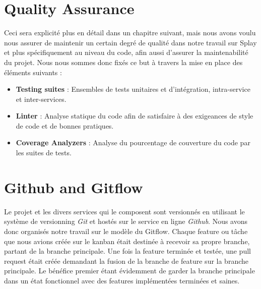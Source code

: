 \documentclass{eplmastersthesis}
\begin{document}
      \section{Quality Assurance}

        Ceci sera explicité plus en détail dans un chapitre suivant, mais nous
        avons voulu nous assurer de maintenir un certain degré de qualité dans
        notre travail sur Splay et plus spécifiquement au niveau du code, afin
        aussi d'assurer la maintenabilité du projet. Nous nous sommes donc
        fixés ce but à travers la mise en place des éléments suivants : \\

        \begin{itemize}
          \item \textbf{Testing suites} : Ensembles de tests unitaires et
          d'intégration, intra-service et inter-services.
          \item \textbf{Linter} : Analyse statique du code afin de satisfaire à
          des exigeances de style de code et de bonnes pratiques.
          \item \textbf{Coverage Analyzers} : Analyse du pourcentage de couverture
          du code par les suites de tests.
        \end{itemize}

      \section{Github and Gitflow}

        Le projet et les divers services qui le composent sont versionnés
        en utilisant le système de versionning \textit{Git} et hostés
        sur le service en ligne \textit{Github}.
        Nous avons donc organisés notre travail sur le modèle du Gitflow.
        Chaque feature ou tâche que nous avions créée sur le kanban était
        destinée à recevoir sa propre branche, partant de la branche principale.
        Une fois la feature terminée et testée, une pull request était créée
        demandant la fusion de la branche de feature sur la branche principale.
        Le bénéfice premier étant évidemment de garder la branche principale
        dans un état fonctionnel avec des features implémentées terminées et
        saines.\\
\end{document}
